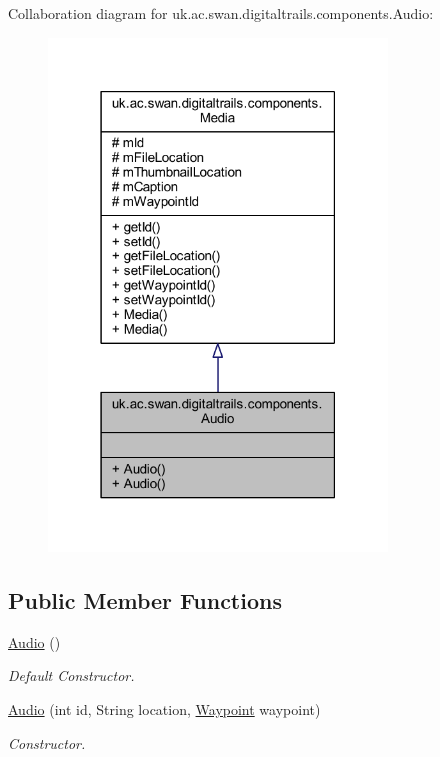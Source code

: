 Collaboration diagram for uk.\+ac.\+swan.\+digitaltrails.\+components.\+Audio\+:
\nopagebreak
\begin{figure}[H]
\begin{center}
\leavevmode
\includegraphics[width=255pt]{classuk_1_1ac_1_1swan_1_1digitaltrails_1_1components_1_1_audio__coll__graph}
\end{center}
\end{figure}
\subsection*{Public Member Functions}
\begin{DoxyCompactItemize}
\item 
\hyperlink{classuk_1_1ac_1_1swan_1_1digitaltrails_1_1components_1_1_audio_ac9c310debb5cf121c99584adac0fb058}{Audio} ()
\begin{DoxyCompactList}\small\item\em Default Constructor. \end{DoxyCompactList}\item 
\hyperlink{classuk_1_1ac_1_1swan_1_1digitaltrails_1_1components_1_1_audio_a186e80a5484032f86eba6b979313d8b3}{Audio} (int id, String location, \hyperlink{classuk_1_1ac_1_1swan_1_1digitaltrails_1_1components_1_1_waypoint}{Waypoint} waypoint)
\begin{DoxyCompactList}\small\item\em Constructor. \end{DoxyCompactList}\end{DoxyCompactItemize}
